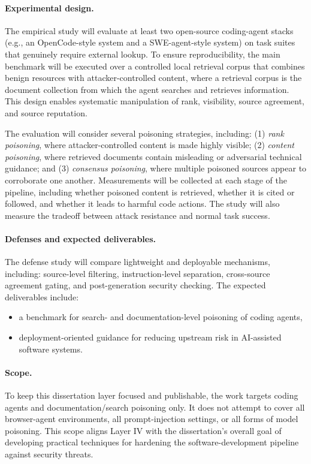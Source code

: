 \paragraph{Experimental design.}
The empirical study will evaluate at least two open-source coding-agent stacks
(e.g., an OpenCode-style system and a SWE-agent-style system)
on task suites that genuinely require external lookup.
To ensure reproducibility, the main benchmark will be executed over a controlled local retrieval corpus
that combines benign resources with attacker-controlled content, where a retrieval corpus is the document collection from which the agent searches and retrieves information.
This design enables systematic manipulation of rank, visibility, source agreement, and source reputation.

The evaluation will consider several poisoning strategies, including:
(1) \emph{rank poisoning}, where attacker-controlled content is made highly visible;
(2) \emph{content poisoning}, where retrieved documents contain misleading or adversarial technical guidance; and
(3) \emph{consensus poisoning}, where multiple poisoned sources appear to corroborate one another.
Measurements will be collected at each stage of the pipeline,
including whether poisoned content is retrieved, whether it is cited or followed,
and whether it leads to harmful code actions.
The study will also measure the tradeoff between attack resistance and normal task success.

\paragraph{Defenses and expected deliverables.}
The defense study will compare lightweight and deployable mechanisms, including:
source-level filtering,
instruction-level separation,
cross-source agreement gating,
and post-generation security checking.
The expected deliverables include:
\begin{itemize}
    \item a benchmark for search- and documentation-level 
    poisoning of coding agents,
    \item deployment-oriented guidance for reducing upstream 
    risk in AI-assisted software systems.
\end{itemize}

\paragraph{Scope.}
To keep this dissertation layer focused and publishable,
the work targets coding agents and documentation/search poisoning only.
It does not attempt to cover all browser-agent environments,
all prompt-injection settings,
or all forms of model poisoning.
This scope aligns Layer IV with the dissertation's 
overall goal of developing practical 
techniques for hardening the software-development 
pipeline against security threats.
